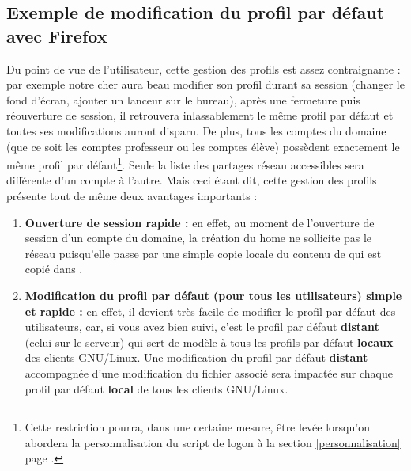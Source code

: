 \subsection{Exemple de modification du profil par défaut avec Firefox}
\label{modifier-profil}

Du point de vue de l'utilisateur, cette gestion des profils 
est assez contraignante : par exemple notre cher  
aura beau modifier son profil durant
sa session (changer le fond d'écran, ajouter un lanceur sur le bureau),
après une fermeture puis réouverture de session, il retrouvera
inlassablement le même profil par défaut et toutes ses modifications
auront disparu. De plus, tous les comptes du
domaine (que ce soit les comptes professeur ou les comptes
élève) possèdent exactement le même profil par défaut\footnote{Cette restriction
pourra, dans une certaine mesure, être levée lorsqu'on abordera la personnalisation du
script de logon à la section \ref{personnalisation} page \pageref{personnalisation}.}.
Seule la liste des partages réseau accessibles sera différente d'un compte à l'autre.
Mais ceci étant dit, cette gestion des profils présente
tout de même deux avantages importants :

\begin{enumerate}
\item \textbf{Ouverture de session rapide :} en effet, au moment de l'ouverture
de session d'un compte du domaine, la création du home ne sollicite pas le
réseau puisqu'elle passe par une simple copie locale du contenu de 
qui est copié dans .

\item \textbf{Modification du profil par défaut (pour tous les
utilisateurs) simple et rapide :} en effet, il devient très facile de modifier
le profil par défaut des utilisateurs, car, si vous avez bien
suivi, c'est le profil par défaut \textbf{distant}
(celui sur le serveur) qui sert de modèle à tous les profils par défaut \textbf{locaux}
des clients GNU/Linux. Une modification du profil par défaut \textbf{distant} accompagnée
d'une modification du fichier  associé sera impactée
sur chaque profil par défaut \textbf{local} de tous les clients GNU/Linux.
\end{enumerate}


